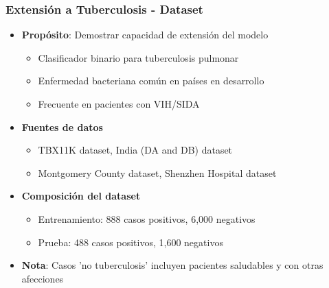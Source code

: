 \begin{frame}
\frametitle{Extensión a Tuberculosis - Dataset}
\begin{itemize}
    \item \textbf{Propósito}: Demostrar capacidad de extensión del modelo
    \begin{itemize}
        \item Clasificador binario para tuberculosis pulmonar
        \item Enfermedad bacteriana común en países en desarrollo
        \item Frecuente en pacientes con VIH/SIDA
    \end{itemize}
    \item \textbf{Fuentes de datos}
    \begin{itemize}
        \item TBX11K dataset, India (DA and DB) dataset
        \item Montgomery County dataset, Shenzhen Hospital dataset
    \end{itemize}
    \item \textbf{Composición del dataset}
    \begin{itemize}
        \item Entrenamiento: 888 casos positivos, 6,000 negativos
        \item Prueba: 488 casos positivos, 1,600 negativos
    \end{itemize}
    \item \textbf{Nota}: Casos 'no tuberculosis' incluyen pacientes saludables y con otras afecciones
\end{itemize}
\end{frame}

